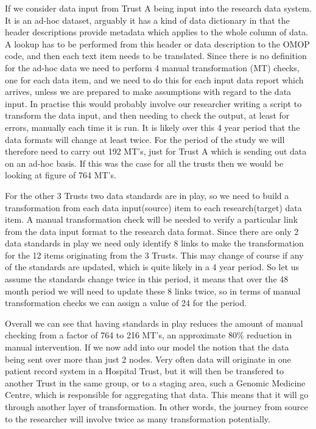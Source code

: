 \documentclass[runningheads]{llncs}
\begin{document}
If we consider data input from Trust A being input into the research data system. It is an ad-hoc dataset, arguably it has a kind of data dictionary in that the header descriptions provide metadata which applies to the whole column of data. A lookup has to be performed from this header or data description to the OMOP code, and then each text item needs to be translated. Since there is no definition for the ad-hoc data we need to perform 4 manual transformation (MT) checks, one for each data item, and we need to do this for each input data report which arrives, unless we are prepared to make assumptions with regard to the data input. In practise this would probably involve our researcher writing a script to transform the data input, and then needing to check the output, at least for errors, manually each time it is run. It is likely over this 4 year period that the data formats will change at least twice. For the period of the study we will therefore need to carry out 192 MT's, just for Trust A which is sending out data on an ad-hoc basis. If this was the case for all the trusts then we would be looking at figure of 764 MT's.

For the other 3 Trusts two data standards are in play, so we need to build a transformation from each data input(source) item to each research(target) data item. A manual transformation check will be needed to verify a particular link from the data input format to the research data format. Since there are only 2 data standards in play we need only identify 8 links to make the transformation for the 12 items originating from the 3 Trusts. This may change of course if any of the standards are updated, which is quite likely in a 4 year period. So let us assume the standards change twice in this period, it means that over the 48 month period we will need to update these 8 links twice, so in terms of manual transformation checks we can assign a value of 24 for the period. 

Overall we can see that having standards in play reduces the amount of manual checking from a factor of 764 to 216 MT's, an approximate 80\% reduction in manual intervention. If we now add into our model the notion that the data being sent over more than just 2 nodes. Very often data will originate in one patient record system in a Hospital Trust, but it will then be transfered to another Trust in the same group, or to a staging area, such a Genomic Medicine Centre, which is responsible for aggregating that data. This means that it will go through another layer of transformation. In other words, the journey from source to the researcher will involve twice as many transformation potentially. 
\end{document}
